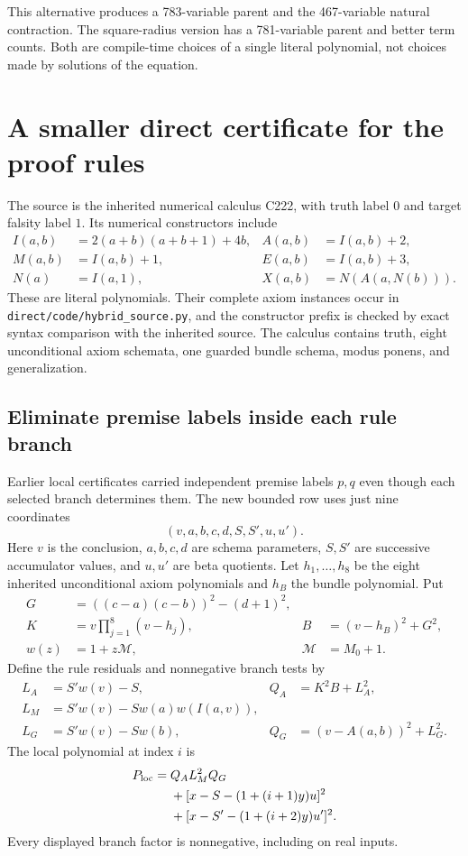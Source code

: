\documentclass[11pt,letterpaper]{article}
\theoremstyle{definition}
\theoremstyle{remark}
\newcommand{\file}[1]{\nolinkurl{#1}}
\begin{document}
This alternative produces a 783-variable parent and the 467-variable
natural contraction. The square-radius version has a 781-variable parent
and better term counts. Both are compile-time choices of a single literal
polynomial, not choices made by solutions of the equation.

\section{A smaller direct certificate for the proof rules}
\label{sec:source}

The source is the inherited numerical calculus C222, with truth label
$0$ and target falsity label $1$. Its numerical constructors include
\begin{align*}
 I(a,b)&=2(a+b)(a+b+1)+4b,& A(a,b)&=I(a,b)+2,\\
 M(a,b)&=I(a,b)+1,& E(a,b)&=I(a,b)+3,\\
 N(a)&=I(a,1),&X(a,b)&=N(A(a,N(b))).
\end{align*}
These are literal polynomials. Their complete axiom instances occur in
\file{direct/code/hybrid_source.py}, and the constructor prefix is
checked by exact syntax comparison with the inherited source. The
calculus contains truth, eight unconditional axiom schemata, one guarded
bundle schema, modus ponens, and generalization.

\subsection{Eliminate premise labels inside each rule branch}

Earlier local certificates carried independent premise labels $p,q$
even though each selected branch determines them. The new bounded row
uses just nine coordinates
\[
                      (v,a,b,c,d,S,S',u,u').
\]
Here $v$ is the conclusion, $a,b,c,d$ are schema parameters, $S,S'$ are
successive accumulator values, and $u,u'$ are beta quotients.
Let $h_1,\ldots,h_8$ be the eight inherited unconditional axiom
polynomials and $h_B$ the bundle polynomial. Put
\begin{align*}
 G&=((c-a)(c-b))^2-(d+1)^2,\\
 K&=v\prod_{j=1}^{8}(v-h_j),&
 B&=(v-h_B)^2+G^2,\\
 w(z)&=1+z\mathcal M,&\mathcal M&=M_0+1.
\end{align*}
Define the rule residuals and nonnegative branch tests by
\begin{align*}
 L_A&=S'w(v)-S,& Q_A&=K^2B+L_A^2,\\
 L_M&=S'w(v)-S w(a)w(I(a,v)),\\
 L_G&=S'w(v)-S w(b),&Q_G&=(v-A(a,b))^2+L_G^2.
\end{align*}
The local polynomial at index $i$ is
\begin{align}\label{eq:local-source}
 P_{\mathrm{loc}}={}&Q_A L_M^2 Q_G\notag\\
 &+[x-S-(1+(i+1)y)u]^2\notag\\
 &+[x-S'-(1+(i+2)y)u']^2.
\end{align}
Every displayed branch factor is nonnegative, including on real inputs.
\end{document}
